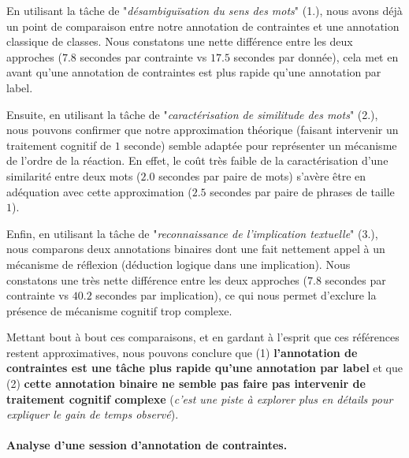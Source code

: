 			En utilisant la tâche de "\textit{désambiguïsation du sens des mots}" (1.), nous avons déjà un point de comparaison entre notre annotation de contraintes et une annotation classique de classes.
			Nous constatons une nette différence entre les deux approches ($7.8$ secondes par contrainte vs $17.5$ secondes par donnée), cela met en avant qu'une annotation de contraintes est plus rapide qu'une annotation par label.
			
			Ensuite, en utilisant la tâche de "\textit{caractérisation de similitude des mots}" (2.), nous pouvons confirmer que notre approximation théorique (faisant intervenir un traitement cognitif de $1$ seconde) semble adaptée pour représenter un mécanisme de l'ordre de la réaction.
			En effet, le coût très faible de la caractérisation d'une similarité entre deux mots ($2.0$ secondes par paire de mots) s'avère être en adéquation avec cette approximation ($2.5$ secondes par paire de phrases de taille $1$).
			
			Enfin, en utilisant la tâche de "\textit{reconnaissance de l'implication textuelle}" (3.), nous comparons deux annotations binaires dont une fait nettement appel à un mécanisme de réflexion (déduction logique dans une implication).
			Nous constatons une très nette différence entre les deux approches ($7.8$ secondes par contrainte vs $40.2$ secondes par implication), ce qui nous permet d'exclure la présence de mécanisme cognitif trop complexe.
	
			\begin{leftBarSummary}
				Mettant bout à bout ces comparaisons, et en gardant à l'esprit que ces références restent approximatives, nous pouvons conclure que (1) \textbf{l'annotation de contraintes est une tâche plus rapide qu'une annotation par label} et que (2) \textbf{cette annotation binaire ne semble pas faire pas intervenir de traitement cognitif complexe} (\textit{c'est une piste à explorer plus en détails pour expliquer le gain de temps observé}).
			\end{leftBarSummary}
		
		
		\paragraph{Analyse d'une session d'annotation de contraintes.}
		
